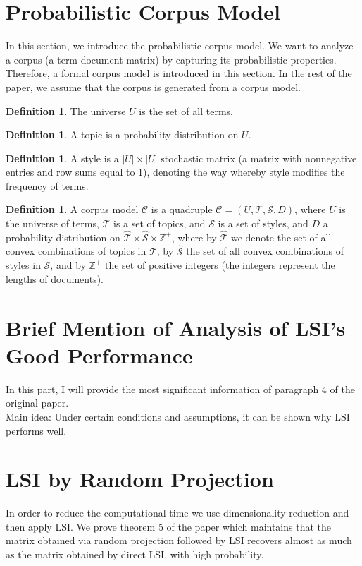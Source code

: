 \documentclass[a4paper,11pt,DIV=15]{scrartcl} %
\theoremstyle{plain}
\theoremstyle{definition}
\newtheorem{definition}[theorem]{Definition}
\begin{document}
 

\section{Probabilistic Corpus Model} %
In this section, we introduce the probabilistic corpus model. We want to analyze a corpus (a term-document matrix) by capturing its probabilistic properties. Therefore, a formal corpus model is introduced in this section. In the rest of the paper, we assume that the corpus is generated from a corpus model.

\begin{definition}
The universe $U$ is the set of all terms.
\end{definition}
\begin{definition}
A topic is a probability distribution on $U$.
\end{definition}
\begin{definition}
    A style is a $|U| \times|U|$ stochastic matrix (a matrix with nonnegative entries and row sums equal to 1), denoting the way whereby style modifies
the frequency of terms.
\end{definition}
\begin{definition}
     A corpus model $\mathscr{C}$ is a quadruple $\mathscr{C} = (U,\mathscr{T}, \mathscr{S}, D)$, where $U$ is
the universe of terms, $\mathscr{T}$ is a set of topics, and $\mathscr{S}$ is a set of styles, and $D$ a probability distribution on $\hat{\mathscr{T}} \times \hat{\mathscr{S}} \times \mathbb{Z}^+$, where by $\hat{\mathscr{T}}$ we denote the set of all convex combinations of topics in $\mathscr{T}$, by $\hat{\mathscr{S}}$ the set of all convex combinations of styles in $\mathscr{S}$, and by 
$\mathbb{Z}^+$ the set of positive integers (the integers represent the lengths of documents).
\end{definition}


\section{Brief Mention of Analysis of LSI's Good Performance} %
In this part, I will provide the most significant information of paragraph 4 of the original paper. \\
Main idea: Under certain conditions and assumptions, it can be shown why LSI performs well.

\section{LSI by Random Projection} %
In order to reduce the computational time we use dimensionality reduction and then apply LSI. We prove theorem 5 of the paper which maintains that the matrix obtained via random projection followed by LSI recovers almost as
much as the matrix obtained by direct LSI, with high probability.
\end{document}
